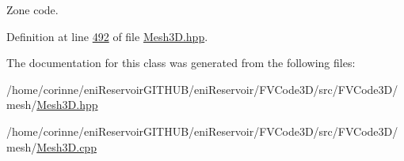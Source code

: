 Zone code. 



Definition at line \hyperlink{Mesh3D_8hpp_source_l00492}{492} of file \hyperlink{Mesh3D_8hpp_source}{Mesh3\+D.\+hpp}.



The documentation for this class was generated from the following files\+:\begin{DoxyCompactItemize}
\item 
/home/corinne/eni\+Reservoir\+G\+I\+T\+H\+U\+B/eni\+Reservoir/\+F\+V\+Code3\+D/src/\+F\+V\+Code3\+D/mesh/\hyperlink{Mesh3D_8hpp}{Mesh3\+D.\+hpp}\item 
/home/corinne/eni\+Reservoir\+G\+I\+T\+H\+U\+B/eni\+Reservoir/\+F\+V\+Code3\+D/src/\+F\+V\+Code3\+D/mesh/\hyperlink{Mesh3D_8cpp}{Mesh3\+D.\+cpp}\end{DoxyCompactItemize}
